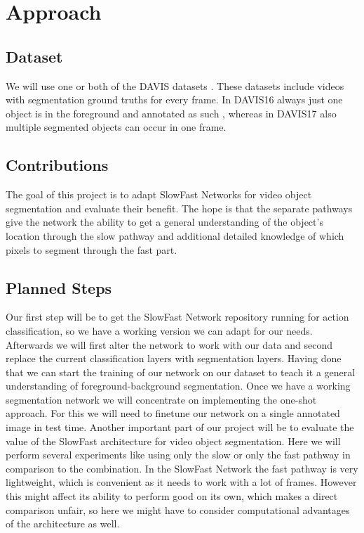 \documentclass[conference]{IEEEtran}
\begin{document}
\section{Approach}
\subsection{Dataset}
We will use one or both of the DAVIS datasets \cite{davis}. These datasets include videos with segmentation ground truths for every frame. In DAVIS16 always just one object is in the foreground and annotated as such , whereas in DAVIS17 also multiple segmented objects can occur in one frame. 
\subsection{Contributions}
The goal of this project is to adapt SlowFast Networks for video object segmentation and evaluate their benefit. The hope is that the separate pathways give the network the ability to get a general understanding of the object’s location through the slow pathway and additional detailed knowledge of which pixels to segment through the fast part.


\subsection{Planned Steps}
Our first step will be to get the SlowFast Network repository running for action classification, so we have a working version we can adapt for our needs. Afterwards  we will first alter the network to work with our data and second replace the current classification layers with segmentation layers. Having done that we can start the training of our network on our dataset to teach it a general understanding of foreground-background segmentation.
Once we have a working segmentation network we will concentrate on implementing the one-shot approach. For this we will need to finetune our network on a single annotated image in test time.
Another important part of our project will be to evaluate the value of the SlowFast architecture for video object segmentation. Here we will perform several experiments like using only the slow or only the fast pathway in comparison to the combination. In the SlowFast Network the fast pathway is very lightweight, which is convenient as it needs to work with a lot of frames. However this might affect its ability to perform good on its own, which makes a direct comparison unfair, so here we might have to consider computational advantages of the architecture as well.
\end{document}
